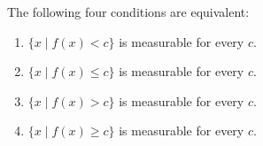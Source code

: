 The following four conditions are equivalent:
\begin{enumerate}
\item[(1)] $\{x \mid f(x) < c\}$ is measurable for every $c$.
\item[(2)] $\{x \mid f(x) \leq c\}$ is measurable for every $c$.
\item[(3)] $\{x \mid f(x) > c\}$ is measurable for every $c$.
\item[(4)] $\{x \mid f(x) \geq c\}$ is measurable for every $c$.
\end{enumerate}
